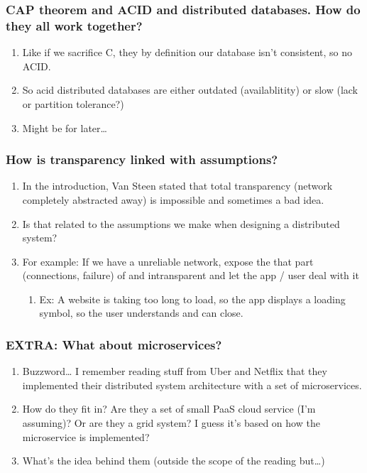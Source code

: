 \documentclass[11pt]{article}
\begin{document}
\subsubsection{CAP theorem and ACID and distributed databases.  How do they all work together?}
\label{sec-1-2-3}
\begin{enumerate}
\item Like if we sacrifice C, they by definition our database isn't consistent, so no ACID.
\label{sec-1-2-3-1}
\item So acid distributed databases are either outdated (availablitity) or slow (lack or partition tolerance?)
\label{sec-1-2-3-2}
\item Might be for later\ldots{}
\label{sec-1-2-3-3}
\end{enumerate}
\subsubsection{How is transparency linked with assumptions?}
\label{sec-1-2-4}
\begin{enumerate}
\item In the introduction, Van Steen stated that total transparency (network completely abstracted away) is impossible and sometimes a bad idea.
\label{sec-1-2-4-1}
\item Is that related to the assumptions we make when designing a distributed system?
\label{sec-1-2-4-2}
\item For example: If we have a unreliable network, expose the that part (connections, failure) of and intransparent and let the app / user deal with it
\label{sec-1-2-4-3}
\begin{enumerate}
\item Ex: A website is taking too long to load, so the app displays a loading symbol, so the user understands and can close.
\label{sec-1-2-4-3-1}
\end{enumerate}
\end{enumerate}
\subsubsection{EXTRA: What about microservices?}
\label{sec-1-2-5}
\begin{enumerate}
\item Buzzword\ldots{} I remember reading stuff from Uber and Netflix that they implemented their distributed system architecture with a set of microservices.
\label{sec-1-2-5-1}
\item How do they fit in?  Are they a set of small PaaS cloud service (I'm assuming)?  Or are they a grid system?  I guess it's based on how the microservice is implemented?
\label{sec-1-2-5-2}
\item What's the idea behind them (outside the scope of the reading but\ldots{})
\label{sec-1-2-5-3}
\end{enumerate}
\end{document}
